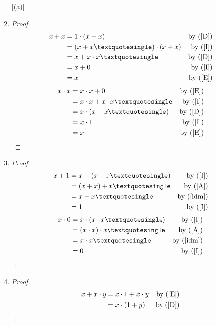 	\begin{enumerate} [(a)]
		\item \begin{proof} \label{idm}
			\begin{align*}
				x+x &= 1\cdot(x+x) &\text{by }(\ref{D})\\
				&= (x+x\textquotesingle)\cdot(x+x) &\text{by }(\ref{I})\\
				&= x+x\cdot x\textquotesingle &\text{by }(\ref{D})\\
				&= x+0 &\text{by }(\ref{I})\\
				&= x &\text{by }(\ref{E})
			\end{align*}
			\begin{align*}
				x\cdot x &= x\cdot x + 0 &\text{by }(\ref{E})\\ 
				&= x\cdot x + x\cdot x\textquotesingle &\text{by }(\ref{I})\\
				&= x\cdot(x+x\textquotesingle) &\text{by }(\ref{D})\\
				&= x\cdot1 &\text{by }(\ref{I})\\
				&= x &\text{by }(\ref{E})
			\end{align*}
		\end{proof}
		\item \begin{proof} \label{bdd}
			\begin{align*}
				x+1 &= x + (x+x\textquotesingle) &\text{by }(\ref{I})\\
				&= (x + x) + x\textquotesingle &\text{by }(\ref{A})\\
				&= x+x\textquotesingle &\text{by (\ref{idm})}\\
				&= 1 &\text{by (\ref{I})}
			\end{align*}
			\begin{align*}
				x\cdot0 &= x\cdot(x\cdot x\textquotesingle) &\text{by (\ref{I})}\\
				&= (x\cdot x)\cdot x\textquotesingle &\text{by (\ref{A})}\\
				&= x\cdot x\textquotesingle &\text{by (\ref{idm})}\\
				&= 0 &\text{by (\ref{I})}
			\end{align*}
		\end{proof}
		\item \begin{proof} \label{abs}
			\begin{align*}
				x+x\cdot y &= x\cdot1 + x\cdot y &\text{by (\ref{E})}\\
				&= x\cdot(1+y) &\text{by (\ref{D})}\\

\end{align*}
\end{proof}
\end{enumerate}
